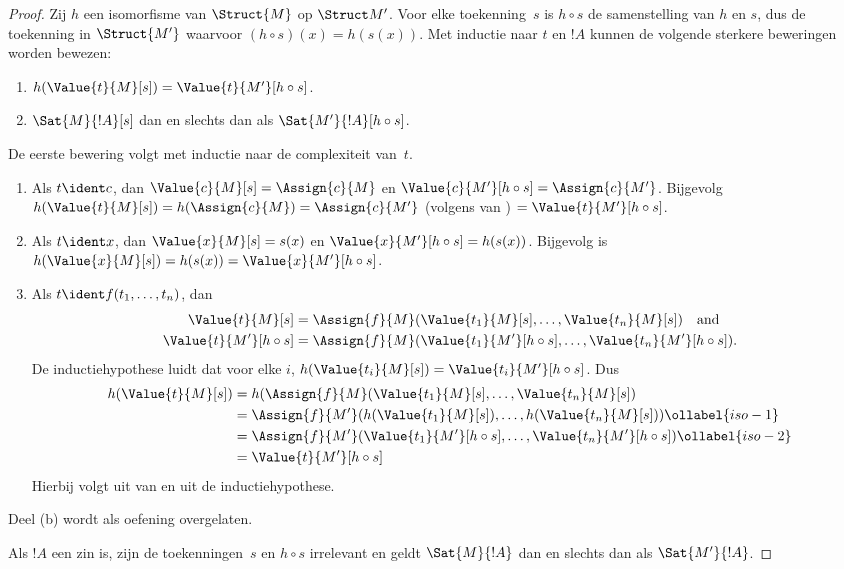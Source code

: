 \documentclass[openany]{memoir}
\begin{document}
\begin{proof}
Zij $h$ een isomorfisme van $\Struct{M}$ op $\Struct M'$. Voor elke
toekenning~$s$ is $h \circ s$ de samenstelling van $h$ en $s$, dus de
toekenning in $\Struct{M'}$ waarvoor $(h \circ s)(x) = h(s(x))$.
Met inductie naar $t$ en $!A$ kunnen de volgende sterkere beweringen
worden bewezen:
\begin{enumerate}
  \item[a.] $h(\Value{t}{M}[s]) = \Value{t}{M'}[h\circ s]$.
  \item[b.] $\Sat{M}{!A}[s]$ dan en slechts dan als $\Sat{M'}{!A}[h \circ s]$.
\end{enumerate}
De eerste bewering volgt met inductie naar de complexiteit van~$t$.
\begin{enumerate}
\item Als $t \ident c$, dan $\Value{c}{M}[s] = \Assign{c}{M}$ en
  $\Value{c}{M'}[h \circ s] = \Assign{c}{M'}$. Bijgevolg
  $h(\Value{t}{M}[s]) = h(\Assign{c}{M}) = \Assign{c}{M'}$ (volgens
   van ) $=
  \Value{t}{M'}[h \circ s]$.
\item Als $t \ident x$, dan $\Value{x}{M}[s] = s(x)$ en
  $\Value{x}{M'}[h \circ s] = h(s(x))$. Bijgevolg is $h(\Value{x}{M}[s]) =
  h(s(x)) = \Value{x}{M'}[h \circ s]$.
\item Als $t \ident f(t_1, \dots, t_n)$, dan
  \begin{align*}
    \Value{t}{M}[s] & = \Assign{f}{M}(\Value{t_1}{M}[s], \dots, \Value{t_n}{M}[s]) \quad\text{and}\\
  \Value{t}{M'}[h \circ s] & = \Assign{f}{M}(\Value{t_1}{M'}[h \circ
    s], \dots, \Value{t_n}{M'}[h \circ s]).
  \end{align*}
  De inductiehypothese luidt dat voor elke $i$, $h(\Value{t_i}{M}[s])
  = \Value{t_i}{M'}[h\circ s]$. Dus
  \begin{align}
    h(\Value{t}{M}[s]) 
    & = h(\Assign{f}{M}(\Value{t_1}{M}[s], \dots, \Value{t_n}{M}[s]) \notag\\
    & = \Assign{f}{M'}(h(\Value{t_1}{M}[s]), \dots,
    h(\Value{t_n}{M}[s])) \ollabel{iso-1}\\
    & = \Assign{f}{M'}(\Value{t_1}{M'}[h \circ s], \dots,
    \Value{t_n}{M'}[h \circ s]) \ollabel{iso-2}\\
    & = \Value{t}{M'}[h\circ s] \notag
  \end{align}
  Hierbij volgt  uit  van
   en  uit de inductiehypothese.
\end{enumerate}
Deel (b) wordt als oefening overgelaten.

Als $!A$ een zin is, zijn de toekenningen~$s$ en $h \circ s$
irrelevant en geldt $\Sat{M}{!A}$ dan en slechts dan als $\Sat{M'}{!A}$.
\end{proof}
\end{document}
